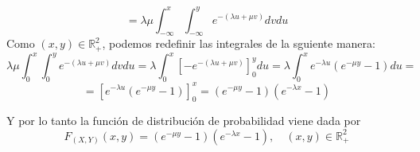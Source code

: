\documentclass[a4paper, 12pt]{article}
\def\R{\mathds{R}}
\begin{document}
    $$= \lambda \mu \int _{-\infty}^x \int _{-\infty}^y  e^{-(\lambda u + \mu v)} dv du$$
    Como $(x,y) \in \R _+^2$, podemos redefinir las integrales de la sguiente manera:
    $$\lambda \mu \int _{0}^x \int _{0}^y  e^{-(\lambda u + \mu v)} dv du = 
    \lambda \int _{0}^x \left[-e^{-(\lambda u + \mu v)}\right]_{0}^y du = 
    \lambda \int _{0}^x e^{-\lambda u} \left(e^{-\mu y}-1\right)du =$$
    $$= \left[e^{-\lambda u} \left(e^{-\mu y}-1\right)\right]_{0}^x = \left(e^{-\mu y}-1\right)\left(e^{-\lambda x}-1\right)$$

    Y por lo tanto la función de distribución de probabilidad viene dada por 
    $$F_{(X,Y)}(x,y) =\left(e^{-\mu y}-1\right)\left(e^{-\lambda x}-1\right), \quad (x,y) \in \R _+^2$$
\end{document}
